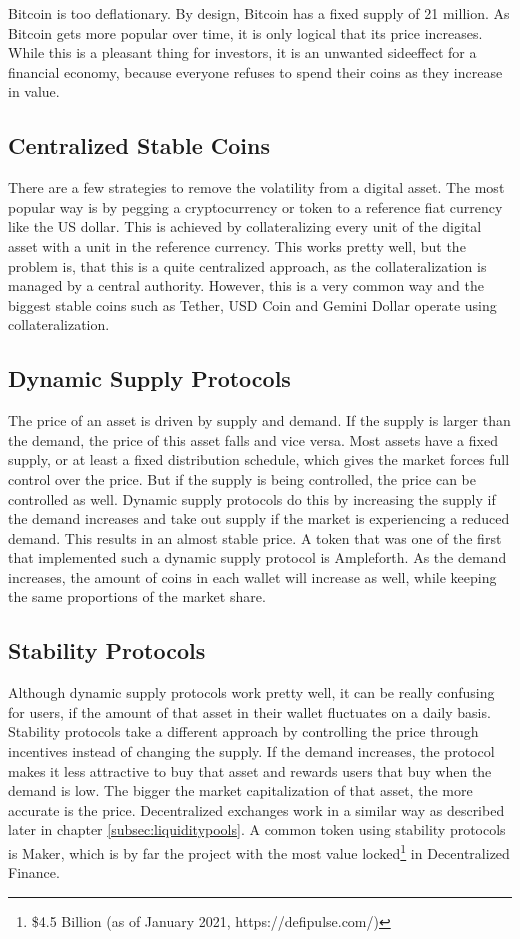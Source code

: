 Bitcoin is too deflationary. By design, Bitcoin has a fixed supply of 21 million. As Bitcoin gets more popular over time, it is only logical that its price increases. While this is a pleasant thing for investors, it is an unwanted sideeffect for a financial economy, because everyone refuses to spend their coins as they increase in value.
\subsection{Centralized Stable Coins}
There are a few strategies to remove the volatility from a digital asset. The most popular way is by pegging a cryptocurrency or token to a reference fiat currency like the US dollar. This is achieved by collateralizing every unit of the digital asset with a unit in the reference currency. This works pretty well, but the problem is, that this is a quite centralized approach, as the collateralization is managed by a central authority. However, this is a very common way and the biggest stable coins such as Tether\cite{Tether2021}, USD Coin\cite{USDCoin2021} and Gemini Dollar\cite{GeminiDollar2021} operate using collateralization.

\subsection{Dynamic Supply Protocols}
The price of an asset is driven by supply and demand. If the supply is larger than the demand, the price of this asset falls and vice versa. Most assets have a fixed supply, or at least a fixed distribution schedule, which gives the market forces full control over the price. But if the supply is being controlled, the price can be controlled as well. Dynamic supply protocols do this by increasing the supply if the demand increases and take out supply if the market is experiencing a reduced demand. This results in an almost stable price. A token that was one of the first that implemented such a dynamic supply protocol is Ampleforth\cite{Ampleforth}. As the demand increases, the amount of coins in each wallet will increase as well, while keeping the same proportions of the market share.

\subsection{Stability Protocols}
Although dynamic supply protocols work pretty well, it can be really confusing for users, if the amount of that asset in their wallet fluctuates on a daily basis. Stability protocols take a different approach by controlling the price through incentives instead of changing the supply. If the demand increases, the protocol makes it less attractive to buy that asset and rewards users that buy when the demand is low. The bigger the market capitalization of that asset, the more accurate is the price. Decentralized exchanges work in a similar way as described later in chapter \ref{subsec:liquiditypools}. A common token using stability protocols is Maker\cite{MakerDAO2021}, which is by far the project with the most value locked\footnote{\$4.5 Billion (as of January 2021, https://defipulse.com/)} in Decentralized Finance.

